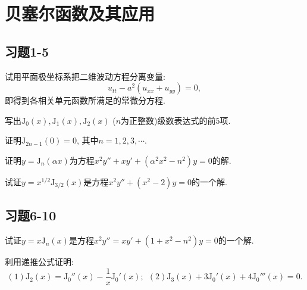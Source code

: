 
\chapter{贝塞尔函数及其应用}

\section{习题1-5}

\begin{yyEx}
	试用平面极坐标系把二维波动方程分离变量:
	\begin{equation*}
	u_{tt} - a^2(u_{xx}+u_{yy}) = 0,
	\end{equation*}
	即得到各相关单元函数所满足的常微分方程.
\end{yyEx}

\begin{yyEx}
	写出$\mathrm{J}_0(x),\mathrm{J}_1(x),\mathrm{J}_2(x)$ ($n$为正整数)级数表达式的前$5$项.
\end{yyEx}

\begin{yyEx}
	证明$\mathrm{J}_{2n-1}(0) = 0$, 其中$n = 1,2,3,\cdots.$
\end{yyEx}

\begin{yyEx}
	证明$y = \mathrm{J}_n(\alpha x)$为方程$x^2y''+xy'+(\alpha^2x^2-n^2)y = 0$的解.
\end{yyEx}

\begin{yyEx}
	试证$y = x^{1/2}\mathrm{J}_{3/2}(x)$是方程$x^2y''+(x^2-2)y = 0$的一个解.
\end{yyEx}



\section{习题6-10}

\begin{yyEx}
	试证$y = x\mathrm{J}_n(x)$是方程$x^2y''=xy'+(1+x^2-n^2)y = 0$的一个解.
\end{yyEx}

\begin{yyEx}
	利用递推公式证明:\begin{equation*}
	(1) \mathrm{J}_2(x) = \mathrm{J}_0''(x) -\frac{1}{x}\mathrm{J}_0'(x);~~(2)\mathrm{J}_3(x) +3 \mathrm{J}_0'(x) +4\mathrm{J}_0'''(x) = 0.
	\end{equation*}
\end{yyEx}

